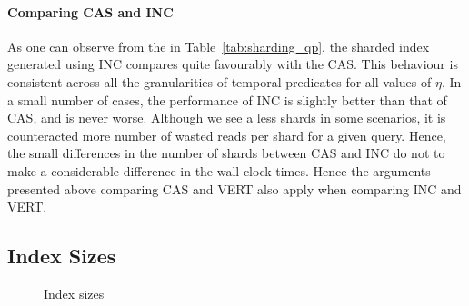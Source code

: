  
\paragraph{Comparing CAS and INC}  As one can observe from the in Table~\ref{tab:sharding_qp}, the sharded index generated using INC compares quite favourably with the CAS. This behaviour is consistent across all the granularities of temporal predicates for all values of $\eta$. In a small number of cases, the performance of INC is slightly better than that of CAS, and is never worse. Although we see a less shards in some scenarios, it is counteracted more number of wasted reads per shard for a given query. Hence, the small differences in the number of shards between CAS and INC do not to make a considerable difference in the wall-clock times. Hence the arguments presented above comparing CAS and VERT also apply when comparing INC and VERT.


\subsection{Index Sizes}


\begin{figure}[tp]
  	\centering	
		\quad
   	\caption{Index sizes}
   	\label{fig:index_sizes}
\end{figure}


